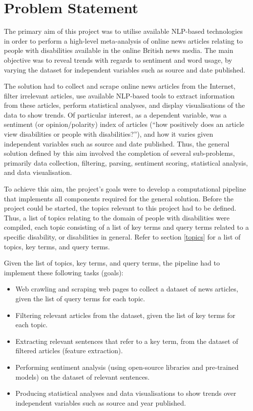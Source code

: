 \documentclass{report}
\begin{document}
\section{Problem Statement} \label{Problem Statement}

The primary aim of this project was to utilise available NLP-based technologies in order to perform a high-level meta-analysis of online news articles relating to people with disabilities available in the online British news media. 
The main objective was to reveal trends with regards to sentiment and word usage, by varying the dataset for independent variables such as source and date published.

The solution had to collect and scrape online news articles from the Internet, filter irrelevant articles, use available NLP-based tools to extract information from these articles, perform statistical analyses, and display visualisations of the data to show trends.
Of particular interest, as a dependent variable, was a sentiment (or opinion/polarity) index of articles (``how positively does an article view disabilities or people with disabilities?''), and how it varies given independent variables such as source and date published.
Thus, the general solution defined by this aim involved the completion of several sub-problems, primarily data collection, filtering, parsing, sentiment scoring, statistical analysis, and data visualisation.

To achieve this aim, the project's goals were to develop a computational pipeline that implements all components required for the general solution.
Before the project could be started, the topics relevant to this project had to be defined.
Thus, a list of topics relating to the domain of people with disabilities were compiled, each topic consisting of a list of key terms and query terms related to a specific disability, or disabilities in general.
Refer to section \ref{topics} for a list of topics, key terms, and query terms.

Given the list of topics, key terms, and query terms, the pipeline had to implement these following tasks (goals):
\begin{itemize}
	\item Web crawling and scraping web pages to collect a dataset of news articles, given the list of query terms for each topic.
	\item Filtering relevant articles from the dataset, given the list of key terms for each topic.
	\item Extracting relevant sentences that refer to a key term, from the dataset of filtered articles (feature extraction).
	\item Performing sentiment analysis (using open-source libraries and pre-trained models) on the dataset of relevant sentences.
	\item Producing statistical analyses and data visualisations to show trends over independent variables such as source and year published.
\end{itemize}
\end{document}
